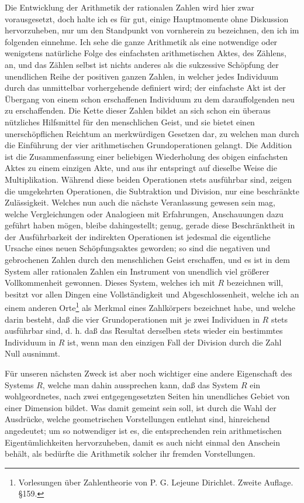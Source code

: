 \documentclass[11pt]{article}
\begin{document}
Die Entwicklung der Arithmetik der rationalen Zahlen wird hier zwar vorausgesetzt, doch halte ich es für gut, einige Hauptmomente ohne Diskussion hervorzuheben, nur um den Standpunkt von vornherein zu bezeichnen, den ich im folgenden einnehme. Ich sehe die ganze Arithmetik als eine notwendige oder wenigstens natürliche Folge des einfachsten arithmetischen Aktes, des Zählens, an, und das Zählen selbst ist nichts anderes als die sukzessive Schöpfung der unendlichen Reihe der positiven ganzen Zahlen, in welcher jedes Individuum durch das unmittelbar vorhergehende definiert wird; der einfachste Akt ist der Übergang von einem schon erschaffenen Individuum zu dem darauffolgenden neu zu erschaffenden. Die Kette dieser Zahlen bildet an sich schon ein überaus nützliches Hilfsmittel für den menschlichen Geist, und sie bietet einen unerschöpflichen Reichtum an merkwürdigen Gesetzen dar, zu welchen man durch die Einführung der vier arithmetischen Grundoperationen gelangt. Die Addition ist die Zusammenfassung einer beliebigen Wiederholung des obigen einfachsten Aktes zu einem einzigen Akte, und aus ihr entspringt auf dieselbe Weise die Multiplikation. Während diese beiden Operationen stets ausführbar sind, zeigen die umgekehrten Operationen, die Subtraktion und Division, nur eine beschränkte Zulässigkeit. Welches nun auch die nächste Veranlassung gewesen sein mag, welche Vergleichungen oder Analogieen mit Erfahrungen, Anschauungen dazu geführt haben mögen, bleibe dahingestellt; genug, gerade diese Beschränktheit in der Ausführbarkeit der indirekten Operationen ist jedesmal die eigentliche Ursache eines neuen Schöpfungsaktes geworden; so sind die negativen und gebrochenen Zahlen durch den menschlichen Geist erschaffen, und es ist in dem System aller rationalen Zahlen ein Instrument von unendlich viel größerer Vollkommenheit gewonnen. Dieses System, welches ich mit $R$ bezeichnen will, besitzt vor allen Dingen eine Vollständigkeit und Abgeschlossenheit, welche ich an einem anderen Orte\footnote{Vorlesungen über Zahlentheorie von P. G. Lejeune Dirichlet. Zweite Auflage. \S 159.} als Merkmal eines Zahlkörpers bezeichnet habe, und welche darin besteht, daß die vier Grundoperationen mit je zwei Individuen in $R$ stets ausführbar sind, d. h. daß das Resultat derselben stets wieder ein bestimmtes Individuum in $R$ ist, wenn man den einzigen Fall der Division durch die Zahl Null ausnimmt.

Für unseren nächsten Zweck ist aber noch wichtiger eine andere Eigenschaft des Systems $R$, welche man dahin aussprechen kann, daß das System $R$ ein wohlgeordnetes, nach zwei entgegengesetzten Seiten hin unendliches Gebiet von einer Dimension bildet. Was damit gemeint sein soll, ist durch die Wahl der Ausdrücke, welche geometrischen Vorstellungen entlehnt sind, hinreichend angedeutet; um so notwendiger ist es, die entsprechenden rein arithmetischen Eigentümlichkeiten hervorzuheben, damit es auch nicht einmal den Anschein behält, als bedürfte die Arithmetik solcher ihr fremden Vorstellungen.
\end{document}
